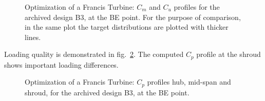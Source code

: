 \begin{figure}[h!]
\begin{minipage}[b]{1\linewidth}
 \centering
\end{minipage}
\caption{Optimization of a Francis Turbine: $C_m$ and $C_u$ profiles for the archived design B3, at the BE point. For the purpose of comparison, in the same plot the target distributions are plotted with thicker lines.}
\label{Francis-B3-OUT}
\end{figure}

Loading quality is demonstrated in fig.\ \ref{Francis-B3-LOAD}. The computed $C_p$ profile at the shroud shows important loading differences. 

\begin{figure}[h!]
\begin{minipage}[b]{1\linewidth}
 \centering
\end{minipage}
\caption{Optimization of a Francis Turbine: $C_p$ profiles hub, mid-span and shroud, for the archived design B3, at the BE point.}
\label{Francis-B3-LOAD}
\end{figure}


